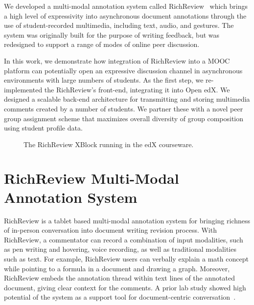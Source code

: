 \documentclass{sigchi}
\begin{document}
We developed a multi-modal annotation system called RichReview~\cite{yoon2014richreview} which brings a high level of expressivity into asynchronous document annotations through the use of student-recorded multimedia, including text, audio, and gestures.
The system was originally built for the purpose of writing feedback, but was redesigned to support a range of modes of online peer discussion.

In this work, we demonstrate how integration of RichReview into a MOOC platform can potentially open an expressive discussion channel in asynchronous environments with large numbers of students.
As the first step, we re-implemented the RichReview's front-end, integrating it into Open edX. We designed a scalable back-end architecture for transmitting and storing multimedia comments created by a number of students.
We partner these with a novel peer group assignment scheme that maximizes overall diversity of group composition using student profile data.

\begin{figure}[!h]
\centering
{
\setlength{\fboxsep}{0pt}
\setlength{\fboxrule}{0.5pt}
}
\caption{The RichReview XBlock running in the edX courseware.}
\label{fig:screenshot}
\end{figure}


\section{RichReview Multi-Modal Annotation System}
RichReview is a tablet based multi-modal annotation system for bringing richness of in-person conversation into document writing revision process.
With RichReview, a commentator can record a combination of input modalities, such as pen writing and hovering, voice recording, as well as traditional modalities such as text.
For example, RichReview users can verbally explain a math concept while pointing to a formula in a document and drawing a graph.
Moreover, RichReview embeds the annotation thread within text lines of the annotated document, giving clear context for the comments.
A prior lab study showed high potential of the system as a support tool for document-centric conversation~\cite{yoon2014richreview}.
\end{document}
